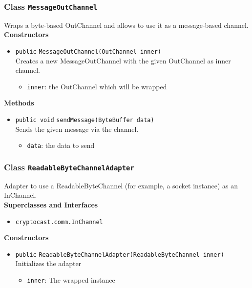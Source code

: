 \subsubsection{Class \lstinline|MessageOutChannel|}
Wraps a byte-based OutChannel and allows to use it as a message-based
 channel. \\




\textbf{Constructors}
\begin{itemize}
\item \lstinline|public| \lstinline|MessageOutChannel|\lstinline|(OutChannel inner)|\\
Creates a new MessageOutChannel with the given OutChannel as inner channel.
\begin{itemize}
\item \lstinline|inner|: the OutChannel which will be wrapped
\end{itemize}



\end{itemize}


\textbf{Methods}
\begin{itemize}
\item \lstinline|public void| \lstinline|sendMessage|\lstinline|(ByteBuffer data)|\\
Sends the given message via the channel.
\begin{itemize}
\item \lstinline|data|: the data to send
\end{itemize}



\end{itemize}

\subsubsection{Class \lstinline|ReadableByteChannelAdapter|}
Adapter to use a ReadableByteChannel (for example, a socket instance) as an InChannel. \\


\textbf{Superclasses and Interfaces}
\begin{itemize}
\item \lstinline|cryptocast.comm.InChannel|
\end{itemize}



\textbf{Constructors}
\begin{itemize}
\item \lstinline|public| \lstinline|ReadableByteChannelAdapter|\lstinline|(ReadableByteChannel inner)|\\
Initializes the adapter
\begin{itemize}
\item \lstinline|inner|: The wrapped instance
\end{itemize}



\end{itemize}



